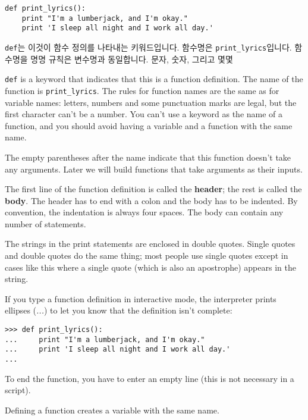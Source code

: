 \beforeverb
\begin{verbatim}
def print_lyrics():
    print "I'm a lumberjack, and I'm okay."
    print 'I sleep all night and I work all day.'
\end{verbatim}
\afterverb
%
{\tt def}는 이것이 함수 정의를 나타내는 키워드입니다. 함수명은 \verb"print_lyrics"입니다.
함수명을 명명 규칙은 변수명과 동일합니다. 문자, 숫자, 그리고 몇몇 

{\tt def} is a keyword that indicates that this is a function
definition.  The name of the function is \verb"print_lyrics".  The
rules for function names are the same as for variable names: letters,
numbers and some punctuation marks are legal, but the first character
can't be a number.  You can't use a keyword as the name of a function,
and you should avoid having a variable and a function with the same
name.


The empty parentheses after the name indicate that this function
doesn't take any arguments.   Later we will build functions that 
take arguments as their inputs.


The first line of the function definition is called the {\bf header};
the rest is called the {\bf body}.  The header has to end with a colon
and the body has to be indented.  By convention, the indentation is
always four spaces.  The body can contain
any number of statements.

The strings in the print statements are enclosed in double
quotes.  Single quotes and double quotes do the same thing;
most people use single quotes except in cases like this where
a single quote (which is also an apostrophe) appears in the string.


If you type a function definition in interactive mode, the interpreter
prints ellipses (\emph{...}) to let you know that the definition
isn't complete:

\beforeverb
\begin{verbatim}
>>> def print_lyrics():
...     print "I'm a lumberjack, and I'm okay."
...     print 'I sleep all night and I work all day.'
...
\end{verbatim}
\afterverb
%
To end the function, you have to enter an empty line (this is
not necessary in a script).

Defining a function creates a variable with the same name.

